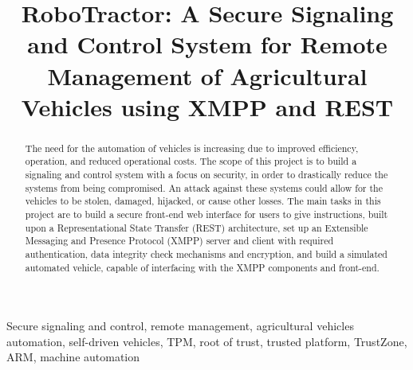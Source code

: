 \documentclass[conference,12pt]{IEEEtran}
\begin{document}
%
\title{RoboTractor: A Secure Signaling and Control System for Remote Management of Agricultural Vehicles using XMPP and REST}

\author{
\and
{}
\and
{}
}
\maketitle


\begin{abstract}
The need for the automation of vehicles is increasing due to
improved efficiency, operation, and reduced operational costs. The scope of this
project is to build a signaling and control system with
a focus on security, in order to drastically reduce the systems from being compromised.
An attack against these systems could allow for the vehicles to be stolen, damaged, hijacked, or cause other losses.
The main tasks in this project are to build a secure front-end
web interface for users to give instructions, built upon a Representational
State Transfer (REST) architecture, set up an Extensible Messaging and
Presence Protocol (XMPP) server and client with required
authentication, data integrity check mechanisms and encryption, and build a
simulated automated vehicle, capable of interfacing with the XMPP
components and front-end.
\end{abstract}

\begin{IEEEkeywords}
    Secure signaling and control, remote management, agricultural vehicles
    automation, self-driven vehicles, TPM, root of trust, trusted platform,
    TrustZone, ARM, machine automation
\end{IEEEkeywords}
\end{document}
